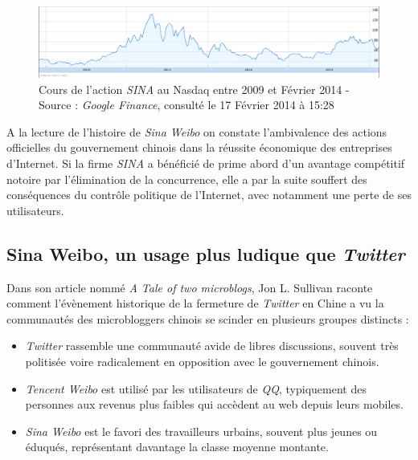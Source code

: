 \begin{figure}[htbp]
    \centering
    \includegraphics[scale=0.4]{figures/chap1/sina.png}
    \caption[Cours de l’action SINA au Nasdaq entre 2009 et Février 2014]{Cours de l’action \textit{SINA} au Nasdaq entre 2009 et Février 2014 - Source : \textit{Google Finance}, consulté le 17 Février 2014 à 15:28 }
    \label{fig:sina_nasdaq}
\end{figure}

A la lecture de l’histoire de \textit{Sina Weibo} on constate l’ambivalence des actions officielles du gouvernement chinois dans la réussite économique des entreprises d’Internet. Si la firme \textit{SINA} a bénéficié de prime abord d’un avantage compétitif notoire par l’élimination de la concurrence, elle a par la suite souffert des conséquences du contrôle politique de l’Internet, avec notamment une perte de ses utilisateurs.


\subsection[Sina Weibo, un usage plus ludique que \textit{Twitter} ]{Sina Weibo, un usage plus ludique que \textit{Twitter} }
Dans son article nommé \textit{A Tale of two microblogs}, Jon L. Sullivan \citep{Sullivan2012} raconte comment l’évènement historique de la fermeture de \textit{Twitter} en Chine a vu la communautés des microbloggers chinois se scinder en plusieurs groupes distincts : 

\begin{itemize}
\item \textit{Twitter} rassemble une communauté avide de libres discussions, souvent très politisée voire radicalement en opposition avec le gouvernement chinois.
\item \textit{Tencent Weibo} est utilisé par les utilisateurs de \textit{QQ}, typiquement des personnes aux revenus plus faibles qui accèdent au web depuis leurs mobiles.
\item \textit{Sina Weibo} est le favori des travailleurs urbains, souvent plus jeunes ou éduqués, représentant davantage la classe moyenne montante.
\end{itemize}

